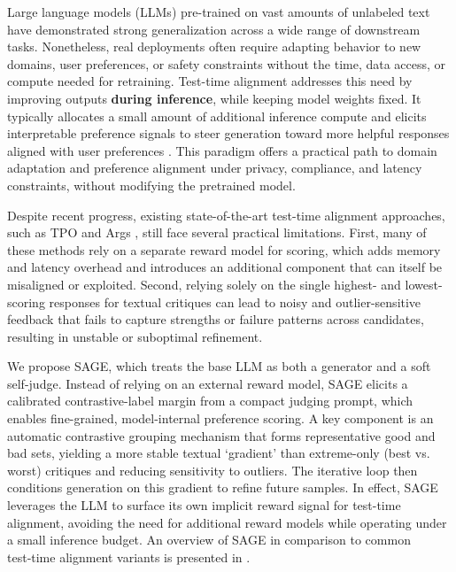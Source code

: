 \documentclass{article}
\theoremstyle{plain}
\theoremstyle{definition}
\theoremstyle{remark}
\newcommand{\method}{SAGE} %
\newcommand{\budget}{B}
\newcommand{\boris}[1]{\textcolor{blue}{Boris: #1}}
\begin{document}
Large language models (LLMs) pre-trained on vast amounts of unlabeled text have demonstrated strong generalization across a wide range of downstream tasks. Nonetheless, real deployments often require adapting behavior to new domains, user preferences, or safety constraints without the time, data access, or compute needed for retraining. Test-time alignment addresses this need by improving outputs \textbf{during inference}, while keeping model weights fixed. It typically allocates a small amount of additional inference compute and elicits interpretable preference signals to steer generation toward more helpful responses aligned with user preferences \cite{litest}. This paradigm offers a practical path to domain adaptation and preference alignment under privacy, compliance, and latency constraints, without modifying the pretrained model.


Despite recent progress, existing state-of-the-art test-time alignment approaches, such as TPO \cite{litest} and Args \cite{khanov2024args}, still face several practical limitations. First, many of these methods rely on a separate reward model for scoring, which adds memory and latency overhead and introduces an additional component that can itself be misaligned or exploited. Second, relying solely on the single highest- and lowest-scoring responses for textual critiques can lead to noisy and outlier-sensitive feedback that fails to capture strengths or failure patterns across candidates, resulting in unstable or suboptimal refinement.



We propose \method{}, which treats the base LLM as both a generator and a soft self-judge. Instead of relying on an external reward model, \method{} elicits a calibrated contrastive-label margin from a compact judging prompt, which enables fine-grained, model-internal preference scoring. A key component is an automatic contrastive grouping mechanism that forms representative good and bad sets, yielding a more stable textual `gradient' than extreme-only (best vs. worst) critiques and reducing sensitivity to outliers. The iterative loop then conditions generation on this gradient to refine future samples. In effect, \method{} leverages the LLM to surface its own implicit reward signal for test-time alignment, avoiding the need for additional reward models while operating under a small inference budget. An overview of \method{} in comparison to common test‑time alignment variants is presented in .
\end{document}
